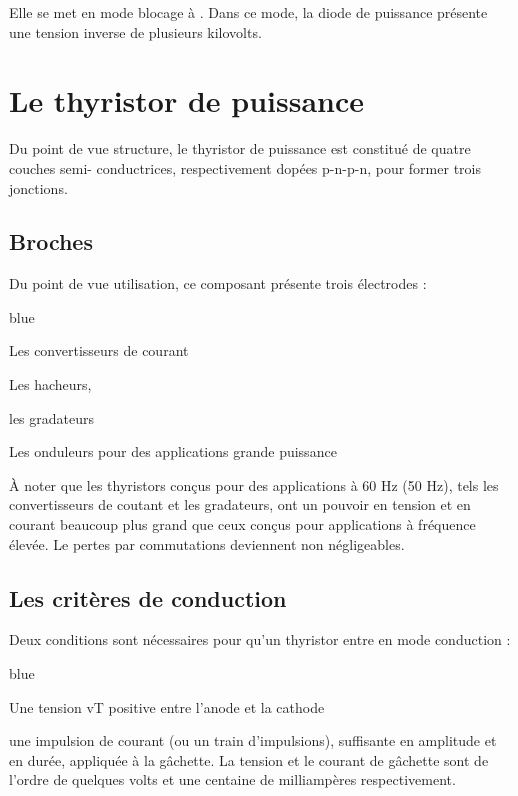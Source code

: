 {Elle se met en mode blocage à . Dans ce mode, la diode de puissance présente une tension inverse de
plusieurs kilovolts.


\section{Le thyristor de puissance}

Du point de vue structure, le thyristor de puissance est constitué de quatre couches semi-
conductrices, respectivement dopées p-n-p-n, pour former trois jonctions.\\

\subsection{Broches}
Du point de vue utilisation, ce composant présente trois électrodes : 

\begin{items}{blue}{\Triangle}
    \item Les convertisseurs de courant
    \item Les hacheurs, 
    \item les gradateurs
    \item Les onduleurs pour des applications grande puissance
\end{items}

À noter que les thyristors conçus pour des applications à 60 Hz (50 Hz), tels les
convertisseurs de coutant et les gradateurs, ont un pouvoir en tension et en courant
beaucoup plus grand que ceux conçus pour applications à fréquence élevée. Le pertes par commutations deviennent non négligeables.

\subsection{Les critères de conduction}

Deux conditions sont nécessaires pour qu’un thyristor entre en mode conduction : 


\begin{items}{blue}{\Triangle}
  \item Une tension vT positive entre l’anode et la cathode
  \item une impulsion de courant (ou un train
  d’impulsions), suffisante en amplitude et en durée, appliquée à la gâchette. La tension
  et le courant de gâchette sont de l’ordre de quelques volts et une centaine de
  milliampères respectivement. \\
\end{items}

}
